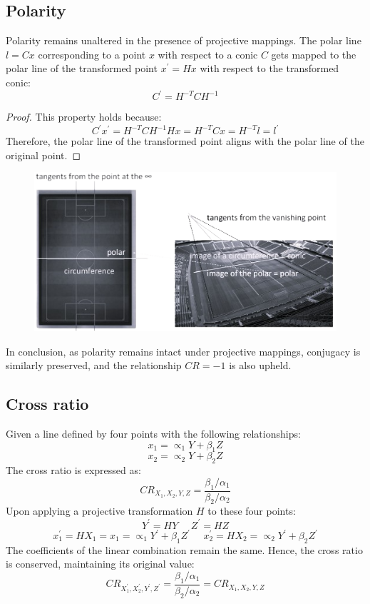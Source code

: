 \subsection{Polarity}
Polarity remains unaltered in the presence of projective mappings.
The polar line $l=Cx$ corresponding to a point $x$ with respect to a conic $C$ gets mapped to the polar line of the transformed point $x^{'} = Hx$ with respect to the transformed conic:
\[C^{'}=H^{-T}CH^{-1}\]
\begin{proof}
    This property holds because:
    \[C^{'}x^{'}=H^{-T}CH^{-1}Hx=H^{-T}Cx=H^{-T}l=l^{'}\]
    Therefore, the polar line of the transformed point aligns with the polar line of the original point.
\end{proof}
\begin{figure}[H]
    \centering
    \includegraphics[width=0.75\linewidth]{images/polarity.png}
\end{figure}
In conclusion, as polarity remains intact under projective mappings, conjugacy is similarly preserved, and the relationship $CR=-1$ is also upheld.

\subsection{Cross ratio}
Given a line defined by four points with the following relationships:
\[x_1=\propto_1Y+\beta_1Z\]
\[x_2=\propto_2Y+\beta_2Z\]
The cross ratio is expressed as:
\[CR_{X_1,X_2,Y,Z}=\dfrac{\beta_1/\alpha_1}{\beta_2/\alpha_2}\]
Upon applying a projective transformation $H$ to these four points:
\[Y^{'}=HY \:\:\:\:\:\: Z^{'}=HZ\] 
\[x^{'}_1=HX_1=x_1=\propto_1Y^{'}+\beta_1Z^{'} \:\:\:\:\:\: x^{'}_2=HX_2=\propto_2Y^{'}+\beta_2Z^{'}\]
The coefficients of the linear combination remain the same. 
Hence, the cross ratio is conserved, maintaining its original value:
\[CR_{X_1^{'},X_2^{'},Y^{'},Z^{'}}=\dfrac{\beta_1/\alpha_1}{\beta_2/\alpha_2}=CR_{X_1,X_2,Y,Z}\]

